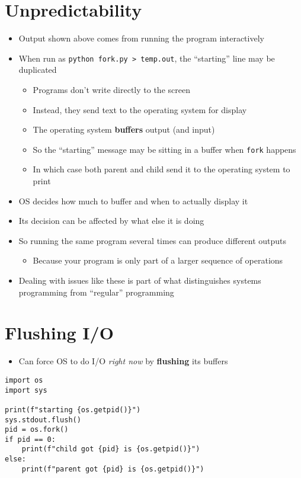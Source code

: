 \documentclass[krantzl]{krantz}
\newcommand{\glossref}[1]{\textbf{#1}}
\begin{document}
\section{Unpredictability}
\begin{itemize}
\item Output shown above comes from running the program interactively

\item When run as \texttt{python fork.py > temp.out}, the “starting” line may be duplicated\begin{itemize}
\item Programs don’t write directly to the screen

\item Instead, they send text to the operating system for display

\item The operating system \glossref{buffers} output (and input)

\item So the “starting” message may be sitting in a buffer when \texttt{fork} happens

\item In which case both parent and child send it to the operating system to print

\end{itemize}


\item OS decides how much to buffer and when to actually display it

\item Its decision can be affected by what else it is doing

\item So running the same program several times can produce different outputs\begin{itemize}
\item Because your program is only part of a larger sequence of operations

\end{itemize}


\item Dealing with issues like these is
    part of what distinguishes systems programming from “regular” programming

\end{itemize}
\section{Flushing I/O}
\begin{itemize}
\item Can force OS to do I/O \emph{right now} by \glossref{flushing} its buffers

\end{itemize}
\begin{lstlisting}[frame=tblr]
import os
import sys

print(f"starting {os.getpid()}")
sys.stdout.flush()
pid = os.fork()
if pid == 0:
    print(f"child got {pid} is {os.getpid()}")
else:
    print(f"parent got {pid} is {os.getpid()}")
\end{lstlisting}
\end{document}
